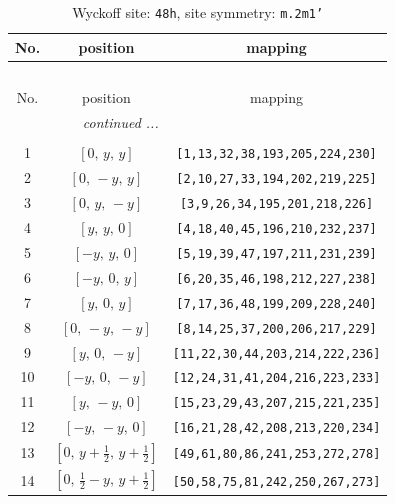 \documentclass[fleqn,8pt]{jsarticle}
\begin{document}
\begin{longtable}{ccc}
\caption{Wyckoff site: {\tt 48h}, site symmetry: {\tt m.2m1'}}
 \\
 \hline \hline
No. & position & mapping \\ \hline \endfirsthead

\multicolumn{2}{l}{\tablename\ \thetable{}} \\
 \hline \hline
No. & position & mapping \\ \hline \endhead

 \hline \hline
\multicolumn{2}{r}{\footnotesize\it continued ...} \\ \endfoot

 \hline \hline
\multicolumn{2}{r}{} \\ \endlastfoot

1 & $\left[ 0,\, y,\, y \right]$ & {\tt [1,13,32,38,193,205,224,230]} \\ \hline
2 & $\left[ 0,\, - y,\, y \right]$ & {\tt [2,10,27,33,194,202,219,225]} \\ \hline
3 & $\left[ 0,\, y,\, - y \right]$ & {\tt [3,9,26,34,195,201,218,226]} \\ \hline
4 & $\left[ y,\, y,\, 0 \right]$ & {\tt [4,18,40,45,196,210,232,237]} \\ \hline
5 & $\left[ - y,\, y,\, 0 \right]$ & {\tt [5,19,39,47,197,211,231,239]} \\ \hline
6 & $\left[ - y,\, 0,\, y \right]$ & {\tt [6,20,35,46,198,212,227,238]} \\ \hline
7 & $\left[ y,\, 0,\, y \right]$ & {\tt [7,17,36,48,199,209,228,240]} \\ \hline
8 & $\left[ 0,\, - y,\, - y \right]$ & {\tt [8,14,25,37,200,206,217,229]} \\ \hline
9 & $\left[ y,\, 0,\, - y \right]$ & {\tt [11,22,30,44,203,214,222,236]} \\ \hline
10 & $\left[ - y,\, 0,\, - y \right]$ & {\tt [12,24,31,41,204,216,223,233]} \\ \hline
11 & $\left[ y,\, - y,\, 0 \right]$ & {\tt [15,23,29,43,207,215,221,235]} \\ \hline
12 & $\left[ - y,\, - y,\, 0 \right]$ & {\tt [16,21,28,42,208,213,220,234]} \\ \hline
13 & $\left[ 0,\, y + \frac{1}{2},\, y + \frac{1}{2} \right]$ & {\tt [49,61,80,86,241,253,272,278]} \\ \hline
14 & $\left[ 0,\, \frac{1}{2} - y,\, y + \frac{1}{2} \right]$ & {\tt [50,58,75,81,242,250,267,273]} \\ \hline

\end{longtable}
\end{document}
